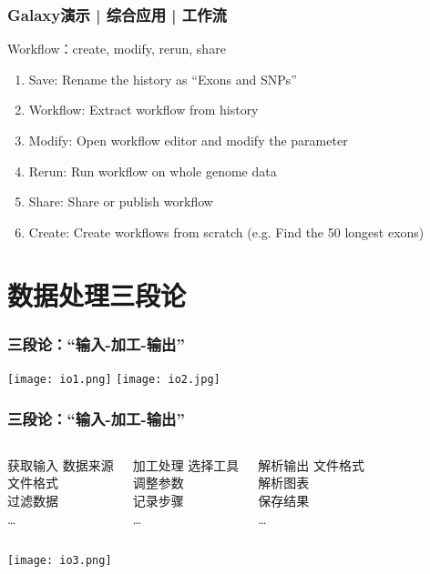 \begin{frame}
  \frametitle{Galaxy演示 | 综合应用 | \alert{工作流}}
  \begin{block}{Workflow：create, modify, rerun, share}
    \pause
  \begin{enumerate}[<+-|alert@+>]
    \item Save: Rename the history as ``Exons and SNPs''
    \item Workflow: Extract workflow from history
    \item Modify: Open workflow editor and modify the parameter
    \item Rerun: Run workflow on whole genome data
    \item Share: Share or publish workflow
    \item Create: Create workflows from scratch (e.g. Find the 50 longest exons)
  \end{enumerate}
  \end{block}
\end{frame}

\section{数据处理三段论}
\begin{frame}
  \frametitle{三段论：“输入-加工-输出”}
  \begin{center}
    \texttt{[image: io1.png]}
    \vspace{0.5cm}
    \texttt{[image: io2.jpg]}
  \end{center}
\end{frame}

\begin{frame}
  \frametitle{三段论：“输入-加工-输出”}
  \begin{columns}
    \begin{block}{获取输入}
      数据来源\\ 文件格式\\ 过滤数据\\ \ldots
    \end{block}
    \begin{block}{加工处理}
      选择工具\\ 调整参数\\ 记录步骤\\ \ldots
    \end{block}
    \begin{block}{解析输出}
      文件格式\\ 解析图表\\ 保存结果\\ \ldots
    \end{block}
  \end{columns}
  \begin{center}
    \texttt{[image: io3.png]}
  \end{center}
\end{frame}

